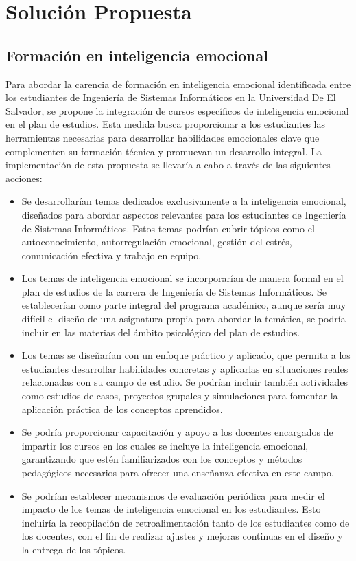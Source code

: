 \documentclass[journal]{IEEEtran}
\begin{document}
\newpage

\section{Solución Propuesta}
\subsection{Formación en inteligencia emocional}
Para abordar la carencia de formación en inteligencia emocional identificada entre los estudiantes de Ingeniería de Sistemas Informáticos en la Universidad De El Salvador, se propone la integración de cursos específicos de inteligencia emocional en el plan de estudios. Esta medida busca proporcionar a los estudiantes las herramientas necesarias para desarrollar habilidades emocionales clave que complementen su formación técnica y promuevan un desarrollo integral. La implementación de esta propuesta se llevaría a cabo a través de las siguientes acciones:\\
\begin{itemize}
	\item Se desarrollarían temas dedicados exclusivamente a la inteligencia emocional, diseñados para abordar aspectos relevantes para los estudiantes de Ingeniería de Sistemas Informáticos. Estos temas podrían cubrir tópicos como el autoconocimiento, autorregulación emocional, gestión del estrés, comunicación efectiva y trabajo en equipo.
	\item Los temas de inteligencia emocional se incorporarían de manera formal en el plan de estudios de la carrera de Ingeniería de Sistemas Informáticos. Se establecerían como parte integral del programa académico, aunque sería muy difícil el diseño de una asignatura propia para abordar la temática, se podría incluir en las materias del ámbito psicológico del plan de estudios.
	\item Los temas se diseñarían con un enfoque práctico y aplicado, que permita a los estudiantes desarrollar habilidades concretas y aplicarlas en situaciones reales relacionadas con su campo de estudio. Se podrían incluir también actividades como estudios de casos, proyectos grupales y simulaciones para fomentar la aplicación práctica de los conceptos aprendidos.
	\item Se podría proporcionar capacitación y apoyo a los docentes encargados de impartir los cursos en los cuales se incluye la inteligencia emocional, garantizando que estén familiarizados con los conceptos y métodos pedagógicos necesarios para ofrecer una enseñanza efectiva en este campo.
	\item Se podrían establecer mecanismos de evaluación periódica para medir el impacto de los temas de inteligencia emocional en los estudiantes. Esto incluiría la recopilación de retroalimentación tanto de los estudiantes como de los docentes, con el fin de realizar ajustes y mejoras continuas en el diseño y la entrega de los tópicos.
\end{itemize}
\end{document}
